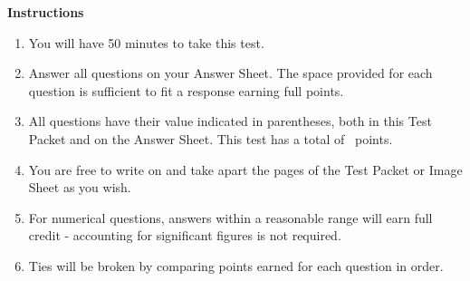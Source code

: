 \documentclass{exam-scioly-araneesh}
\begin{document}
\begin{large}
\begin{center} \textbf{\Large Instructions} \end{center}
\begin{enumerate}
    \itemsep-0.25em
    \item You will have 50 minutes to take this test.
    \item Answer all questions on your Answer Sheet. The space provided for each question is sufficient to fit a response earning full points.
    \item All questions have their value indicated in parentheses, both in this Test Packet and on the Answer Sheet. This test has a total of \sumpoints~points.
    \item You are free to write on and take apart the pages of the Test Packet or Image Sheet as you wish.
    \item For numerical questions, answers within a reasonable range will earn full credit - accounting for significant figures is not required.
    \item Ties will be broken by comparing points earned for each question in order.
\end{enumerate}
\end{large}
\pagebreak

\begin{multicols}{2}
\begin{enumerate}
\begin{large}


\vfill\null
\label{LastPageRef}

\end{large}
\end{enumerate}
\end{multicols}
\end{document}
